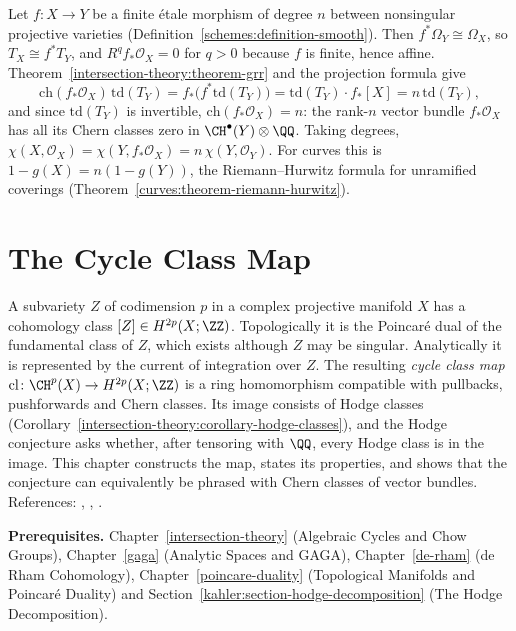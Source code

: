 \begin{example}\label{intersection-theory:example-grr-etale}
Let $f \colon X \to Y$ be a finite \'etale morphism of degree $n$ between nonsingular projective varieties (Definition~\ref{schemes:definition-smooth}). Then $f^*\Omega_Y \cong \Omega_X$, so $T_X \cong f^*T_Y$, and
$R^qf_*\mathcal{O}_X = 0$ for $q > 0$ because $f$ is finite, hence affine. Theorem~\ref{intersection-theory:theorem-grr} and the projection formula give
\[
\mathrm{ch}(f_*\mathcal{O}_X)\,\mathrm{td}(T_Y) = f_*\big(f^*\mathrm{td}(T_Y)\big) = \mathrm{td}(T_Y)\cdot f_*[X] = n\,\mathrm{td}(T_Y),
\]
and since $\mathrm{td}(T_Y)$ is invertible, $\mathrm{ch}(f_*\mathcal{O}_X) = n$: the rank-$n$ vector bundle $f_*\mathcal{O}_X$ has all its Chern classes zero in $\CH^\bullet(Y) \otimes \QQ$. Taking degrees,
$\chi(X, \mathcal{O}_X) = \chi(Y, f_*\mathcal{O}_X) = n\,\chi(Y, \mathcal{O}_Y)$. For curves this is $1 - g(X) = n(1 - g(Y))$, the Riemann--Hurwitz formula for unramified coverings
(Theorem~\ref{curves:theorem-riemann-hurwitz}).
\end{example}

\section{The Cycle Class Map}\label{intersection-theory:section-cycle-class}
A subvariety $Z$ of codimension $p$ in a complex projective manifold $X$ has a cohomology class $[Z] \in H^{2p}(X; \ZZ)$. Topologically it is the
Poincar\'e dual of the fundamental class of $Z$, which exists although $Z$ may be singular. Analytically it is represented by the current of integration
over $Z$. The resulting \emph{cycle class map} $\mathrm{cl} \colon \CH^p(X) \to H^{2p}(X; \ZZ)$ is a ring homomorphism compatible with pullbacks, pushforwards
and Chern classes. Its image consists of Hodge classes (Corollary~\ref{intersection-theory:corollary-hodge-classes}), and the Hodge conjecture asks whether, after tensoring
with $\QQ$, every Hodge class is in the image. This chapter constructs the map, states its properties, and shows that the conjecture can equivalently be
phrased with Chern classes of vector bundles. References: \cite[Chapter 19]{fulton-intersection}, \cite[Chapter 11]{voisin-hodge-1}, \cite[Chapter 0, Section 4]{griffiths-harris}.

\noindent\textbf{Prerequisites.} Chapter~\ref{intersection-theory} (Algebraic Cycles and Chow Groups), Chapter~\ref{gaga} (Analytic Spaces and GAGA),
Chapter~\ref{de-rham} (de Rham Cohomology), Chapter~\ref{poincare-duality} (Topological Manifolds and Poincar\'e Duality) and Section~\ref{kahler:section-hodge-decomposition}
(The Hodge Decomposition).

